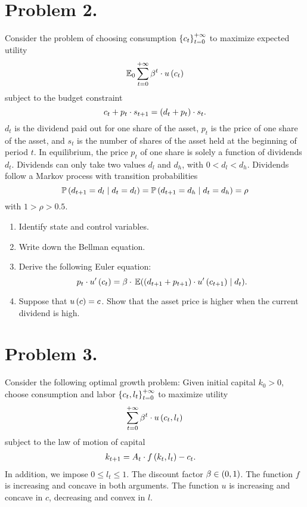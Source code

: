 \documentclass[letterpaper,12pt,leqno]{article}
\begin{document}
\section*{Problem 2.}

Consider the problem of choosing consumption $\left\lbrace c_{t} \right\rbrace_{t=0}^{+\infty}$ to maximize expected utility
\begin{equation*}
\E_{0}\sum_{t=0}^{+\infty}\b^{t}\cdot u\bp{c_{t}}
\end{equation*}
subject to the budget constraint
\begin{equation*}
c_{t}+p_{t}\cdot s_{t+1}=\left( d_{t}+p_{t} \right)\cdot s_{t}.
\end{equation*}
$d_{t}$ is the dividend paid out for one share of the asset, $p_{t}$ is the price of one share of the asset, and $s_{t}$ is the number of shares of the asset held at the beginning of period $t$. In equilibrium, the price $p_{t}$ of one share is solely a function of dividends $d_{t}$. Dividends can only take two values $d_{l}$ and $d_{h}$, with $0<d_{l}<d_{h}$. Dividends follow a Markov process with transition probabilities 
\begin{equation*}
\P\bp{d_{t+1}=d_{l}\mid d_{t}=d_{l}} =\P \bp{d_{t+1}=d_{h}\mid d_{t}=d_{h}} =\rho
\end{equation*}
with $1>\rho >0.5.$

\begin{enumerate}
\item Identify state and control variables. 
\item Write down the Bellman equation.
\item Derive the following Euler equation: 
\begin{equation*}
p_{t}\cdot u'\bp{c_{t}} =\b\cdot  \E{\bp{d_{t+1}+p_{t+1}} \cdot u'\bp{c_{t+1}} \mid d_{t}} .
\end{equation*}

\item Suppose that $u\left( c \right) =c$. Show that the asset price is higher when the current dividend is high.
\end{enumerate}

\section*{Problem 3.}

Consider the following optimal growth problem: Given initial capital $k_{0}>0$, choose consumption and labor $\left\lbrace c_{t},l_{t} \right\rbrace_{t=0}^{+\infty}$ to maximize utility
\begin{equation*}
\sum_{t=0}^{+\infty}\beta^{t}\cdot u\left( c_{t},l_{t} \right)
\end{equation*}
subject to the law of motion of capital
\begin{align*}
k_{t+1}&=A_{t}\cdot f\left( k_{t},l_{t} \right) -c_{t}.
\end{align*}
In addition, we impose $0\leq l_{t}\leq 1$. The discount factor $\beta \in \left( 0,1 \right) $. The function $f$ is increasing and concave in both arguments. The function $u$ is increasing and concave in $c$, decreasing and convex in $l$. 
\end{document}
